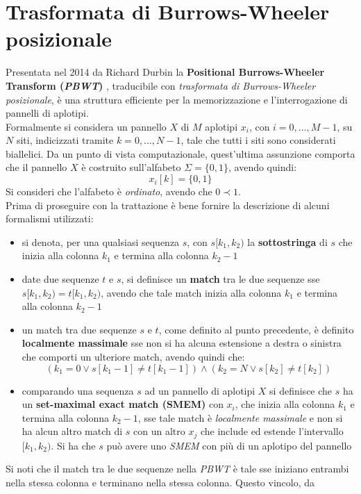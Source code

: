 \section{Trasformata di Burrows-Wheeler posizionale}
\label{secpbwt}
Presentata nel 2014 da Richard Durbin la \textbf{Positional Burrows-Wheeler
  Transform (\textit{PBWT})} \cite{pbwt}, traducibile con \textit{trasformata di
  Burrows-Wheeler posizionale}, è una struttura efficiente per la memorizzazione
e l'interrogazione di pannelli di aplotipi.\\
Formalmente si considera un pannello $X$ di $M$ aplotipi $x_i$, con $i=0,\ldots,
M-1$, su $N$ siti, indicizzati tramite $k=0,\ldots, N-1$, tale che tutti i siti
sono considerati biallelici. 
Da un punto di vista computazionale, quest'ultima
assunzione comporta che il pannello $X$ è costruito sull'alfabeto $\Sigma
=\{0,1\}$, avendo quindi:
\[x_i[k]=\{0,1\}\]
Si consideri che l'alfabeto è \textit{ordinato}, avendo che $0\prec 1$.\\
Prima di proseguire con la trattazione è bene fornire la descrizione di alcuni
formalismi utilizzati:
\begin{itemize}
  \item si denota, per una qualsiasi sequenza $s$, con $s[k_1,k_2)$ la
  \textbf{sottostringa} di $s$ che inizia alla colonna $k_1$ e termina alla colonna
  $k_2-1$
  \item date due sequenze $t$ e $s$, si definisce un \textbf{match} tra le due
  sequenze sse $s[k_1,k_2)=t[k_1,k_2)$, avendo che tale match inizia alla
  colonna $k_1$ e termina alla colonna $k_2-1$
  \item un match tra due sequenze $s$ e $t$, come definito al punto precedente,
  è definito \textbf{localmente massimale} sse non si ha alcuna estensione a
  destra o sinistra che comporti un ulteriore match, avendo quindi che:
  \[(k_1=0\lor s[k_1-1]\neq t[k_1-1])\land (k_2=N\lor s[k_2]\neq t[k_2] )\]
  \item comparando una sequenza $s$ ad un pannello di aplotipi $X$ si definisce
  che $s$ ha un \textbf{set-maximal exact match (SMEM)} con $x_i$, che inizia alla
  colonna $k_1$ e termina alla colonna $k_2-1$, sse tale match è
  \textit{localmente massimale} e non si ha alcun altro match di $s$ con un
  altro $x_j$ che include ed estende l'intervallo $[k_1,k_2)$. Si ha che $s$
  può avere uno \textit{SMEM} con più di un aplotipo del pannello
\end{itemize}
Si noti che il match tra le due sequenze nella \textit{PBWT} è tale sse iniziano
entrambi nella stessa colonna e terminano nella stessa colonna. Questo vincolo, da
